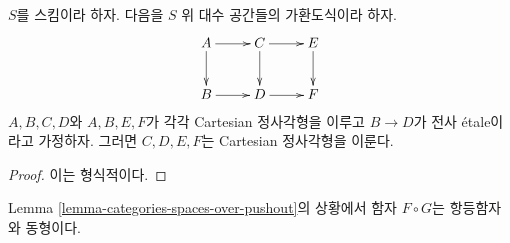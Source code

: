 \begin{lemma}
\label{lemma-diagram}
$S$를 스킴이라 하자. 다음을 $S$ 위 대수 공간들의 가환도식이라 하자.
$$
\xymatrix{
A \ar[r] \ar[d] & C \ar[d] \ar[r] & E \ar[d] \\
B \ar[r] & D \ar[r] & F
}
$$
$A, B, C, D$와 $A, B, E, F$가 각각 Cartesian 정사각형을 이루고
$B \to D$가 전사 \'etale이라고 가정하자.
그러면 $C, D, E, F$는 Cartesian 정사각형을 이룬다.
\end{lemma}

\begin{proof}
이는 형식적이다.
\end{proof}

\begin{lemma}
\label{lemma-equivalence-categories-spaces-over-pushout}
Lemma \ref{lemma-categories-spaces-over-pushout}의 상황에서
함자 $F \circ G$는 항등함자와 동형이다.
\end{lemma}

